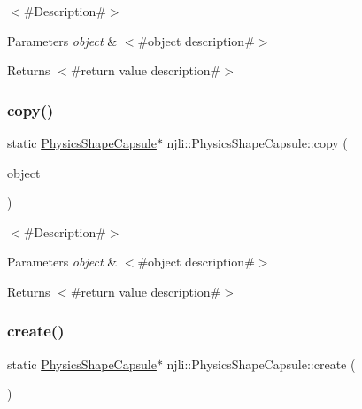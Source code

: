 $<$\#\+Description\#$>$


\begin{DoxyParams}{Parameters}
{\em object} & $<$\#object description\#$>$\\
\hline
\end{DoxyParams}
\begin{DoxyReturn}{Returns}
$<$\#return value description\#$>$ 
\end{DoxyReturn}
\mbox{\label{classnjli_1_1_physics_shape_capsule_a0340921c913c7b57a0b553876471bf98}} 
\subsubsection{\texorpdfstring{copy()}{copy()}}
{\footnotesize\ttfamily static \mbox{\hyperlink{classnjli_1_1_physics_shape_capsule}{Physics\+Shape\+Capsule}}$\ast$ njli\+::\+Physics\+Shape\+Capsule\+::copy (\begin{DoxyParamCaption}\item[{const \mbox{\hyperlink{classnjli_1_1_physics_shape_capsule}{Physics\+Shape\+Capsule}} \&}]{object }\end{DoxyParamCaption})\hspace{0.3cm}{\ttfamily [static]}}

$<$\#\+Description\#$>$


\begin{DoxyParams}{Parameters}
{\em object} & $<$\#object description\#$>$\\
\hline
\end{DoxyParams}
\begin{DoxyReturn}{Returns}
$<$\#return value description\#$>$ 
\end{DoxyReturn}
\mbox{\label{classnjli_1_1_physics_shape_capsule_a735bd23707d27292b7d94124afffed5d}} 
\subsubsection{\texorpdfstring{create()}{create()}\hspace{0.1cm}{\footnotesize\ttfamily [1/2]}}
{\footnotesize\ttfamily static \mbox{\hyperlink{classnjli_1_1_physics_shape_capsule}{Physics\+Shape\+Capsule}}$\ast$ njli\+::\+Physics\+Shape\+Capsule\+::create (\begin{DoxyParamCaption}{ }\end{DoxyParamCaption})\hspace{0.3cm}{\ttfamily [static]}}


